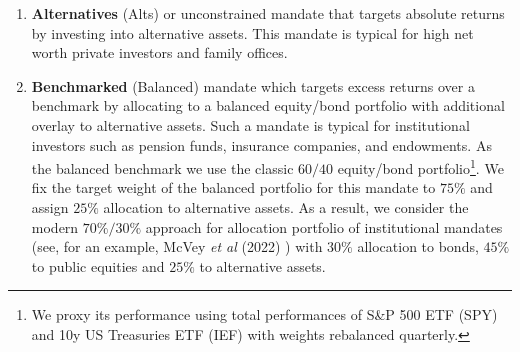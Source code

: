 \documentclass[pdftex,11pt,a4paper] {article}
\begin{document}
\begin{enumerate}
\item \textbf{Alternatives} (Alts) or unconstrained mandate that targets absolute returns by investing into alternative assets. This mandate is typical for high net worth private investors and family offices. 
	
	
\item \textbf{Benchmarked} (Balanced) mandate which targets excess returns over a benchmark by allocating to a balanced equity/bond portfolio with additional overlay to alternative assets. Such a mandate is typical for institutional investors such as pension funds, insurance companies, and endowments. As the balanced benchmark we use the classic $60/40$ equity/bond portfolio\footnote{We proxy its performance using total performances of S\&P 500 ETF (SPY) and 10y US Treasuries ETF (IEF) with weights rebalanced quarterly.}. We fix the target weight of the balanced portfolio for this mandate to $75\%$ and assign $25\%$ allocation to alternative assets. As a result, we consider the modern $70\%/30\%$ approach for allocation portfolio of institutional mandates (see, for an example, McVey \textit{et al} (2022) \cite{McVey2022}) with $30\%$ allocation to bonds, $45\%$ to public equities and $25\%$ to alternative assets. 
	
\end{enumerate}
\end{document}
